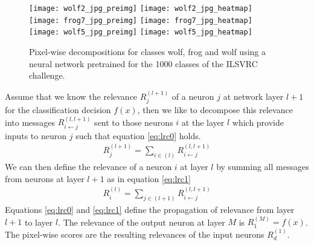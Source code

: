 \documentclass[runningheads,a4paper]{llncs}
\begin{document}
\begin{figure*}[t]
\centering
\texttt{[image: wolf2\_jpg\_preimg]}
\texttt{[image: wolf2\_jpg\_heatmap]}
\texttt{[image: frog7\_jpg\_preimg]}
\texttt{[image: frog7\_jpg\_heatmap]}
\texttt{[image: wolf5\_jpg\_preimg]}
\texttt{[image: wolf5\_jpg\_heatmap]}
\vskip -2mm
\caption{\label{fig:someheatmaps2} Pixel-wise decompositions for classes wolf, frog and wolf using a neural network pretrained for the 1000 classes of the ILSVRC challenge.}
\end{figure*}

Assume that we know the relevance $R^{(l+1)}_j$ of a neuron $j$ at network layer $l+1$ for the classification decision $f(x)$, then we like to decompose this relevance into messages $R^{(l,l+1)}_{i \leftarrow j}$ sent to those neurons $i$ at the layer $l$ which provide inputs to neuron $j$ such that equation \ref{eq:lrc0} holds.
\begin{align}
  R^{(l+1)}_j=\sum_{i \in (l)} R^{(l,l+1)}_{i \leftarrow j} \label{eq:lrc0}
\end{align}
\vskip -1mm
We can then define the relevance of a neuron $i$ at layer $l$ by summing all messages from neurons at layer $l+1$ as in equation \ref{eq:lrc1}
\begin{align}
  R^{(l)}_i=\sum_{j \in (l+1)} R^{(l,l+1)}_{i \leftarrow j} \label{eq:lrc1}
\end{align}
\vskip -1mm
Equations \ref{eq:lrc0} and \ref{eq:lrc1} define the propagation of relevance from layer $l+1$ to layer $l$. The relevance of the output neuron at layer $M$ is $R^{(M)}_1=f(x)$. The pixel-wise scores are the resulting relevances of the input neurons $R^{(1)}_d$. 
\end{document}
